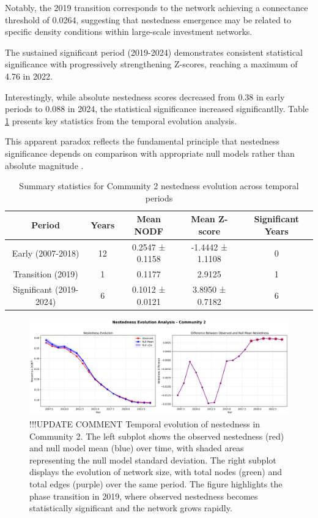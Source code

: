 Notably, the 2019 transition corresponds to the network achieving a connectance threshold of 0.0264, suggesting that nestedness emergence may be related to specific density conditions within large-scale investment networks.

The sustained significant period (2019-2024) demonstrates consistent statistical significance with progressively strengthening Z-scores, reaching a maximum of 4.76 in 2022. 

Interestingly, while absolute nestedness scores decreased from 0.38 in early periods to 0.088 in 2024, the statistical significance increased significantlly. Table \ref{tab:nestedness_evolution_summary} presents key statistics from the temporal evolution analysis.

This apparent paradox reflects the fundamental principle that nestedness significance depends on comparison with appropriate null models rather than absolute magnitude \cite{Mariani2019}.

\begin{table}[htbp]
\hspace*{-1cm}\centering
\begin{tabular}{|c|c|c|c|c|}
\hline
\textbf{Period} & \textbf{Years} & \textbf{Mean NODF} & \textbf{Mean Z-score} & \textbf{Significant Years} \\
\hline
Early (2007-2018) & 12 & 0.2547 ± 0.1158 & -1.4442 ± 1.1108 & 0 \\
Transition (2019) & 1 & 0.1177 & 2.9125 & 1 \\
Significant (2019-2024) & 6 & 0.1012 ± 0.0121 & 3.8950 ± 0.7182 & 6 \\
\hline
\end{tabular}
\caption{Summary statistics for Community 2 nestedness evolution across temporal periods}
\label{tab:nestedness_evolution_summary}
\end{table}

\begin{figure}[htbp]
\hspace*{-1cm}\centering
\includegraphics[width=1.2\textwidth]{../figures/us/nestedness_evolution_community_2_pt1.png}
\caption{!!!UPDATE COMMENT Temporal evolution of nestedness in Community 2. The left subplot shows the observed nestedness (red) and null model mean (blue) over time, with shaded areas representing the null model standard deviation. The right subplot displays the evolution of network size, with total nodes (green) and total edges (purple) over the same period. The figure highlights the phase transition in 2019, where observed nestedness becomes statistically significant and the network grows rapidly.}
\label{fig:observed_vs_null_model}
\end{figure}

